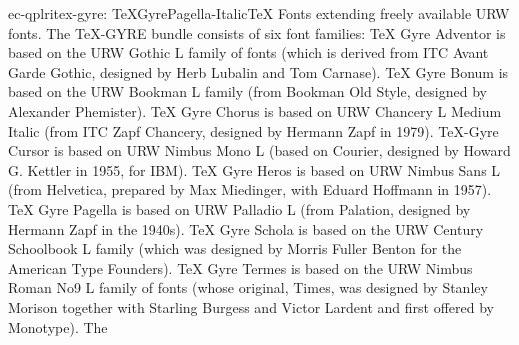 \documentclass{ddltxtyp}
\begin{document}
\begin{package}{ec-qplri}{tex-gyre: TeXGyrePagella-Italic}{{\TeX} Fonts extending freely available URW fonts.}
The {\TeX}-GYRE bundle consists of six font families: {\TeX} Gyre
Adventor is based on the URW Gothic L family of fonts (which is
derived from ITC Avant Garde Gothic, designed by Herb Lubalin
and Tom Carnase). {\TeX} Gyre Bonum is based on the URW Bookman L
family (from Bookman Old Style, designed by Alexander
Phemister). {\TeX} Gyre Chorus is based on URW Chancery L Medium
Italic (from ITC Zapf Chancery, designed by Hermann Zapf in
1979). {\TeX}-Gyre Cursor is based on URW Nimbus Mono L (based on
Courier, designed by Howard G. Kettler in 1955, for IBM). {\TeX}
Gyre Heros is based on URW Nimbus Sans L (from Helvetica,
prepared by Max Miedinger, with Eduard Hoffmann in 1957). {\TeX}
Gyre Pagella is based on URW Palladio L (from Palation,
designed by Hermann Zapf in the 1940s). {\TeX} Gyre Schola is
based on the URW Century Schoolbook L family (which was
designed by Morris Fuller Benton for the American Type
Founders). {\TeX} Gyre Termes is based on the URW Nimbus Roman No9
L family of fonts (whose original, Times, was designed by
Stanley Morison together with Starling Burgess and Victor
Lardent and first offered by Monotype). The %
\end{package}
\end{document}
